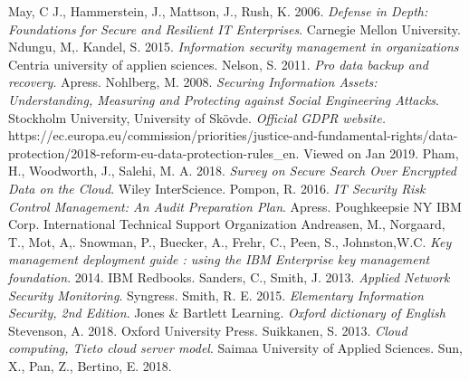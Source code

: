 \documentclass{article}
\begin{document}
\begin{thebibliography}{9}
	May, C J.,
	Hammerstein, J.,
	Mattson, J.,
	Rush, K.
	2006.
	\textit{Defense in Depth: Foundations for Secure and Resilient IT Enterprises}.
	Carnegie Mellon University.
	Ndungu, M,.
	Kandel, S.
	2015.
	\textit{Information security management in organizations}
	Centria university of applien sciences.
        Nelson, S.
        2011.
        \textit{Pro data backup and recovery}.
	Apress.
	Nohlberg, M.
	2008.
	\textit{Securing Information Assets: Understanding, Measuring and Protecting against Social Engineering Attacks}.
	Stockholm University,
	University of Skövde.
	\textit{Official GDPR website.}
	https://ec.europa.eu/commission/priorities/justice-and-fundamental-rights/data-protection/2018-reform-eu-data-protection-rules\_en.
	Viewed on Jan 2019.
	Pham, H.,
	Woodworth, J.,
	Salehi, M. A.
	2018.
	\textit{Survey on Secure Search Over Encrypted Data on the Cloud}.
	Wiley InterScience.
        Pompon, R.
        2016.
        \textit{IT Security Risk Control Management: An Audit Preparation Plan}.
	Apress.
        Poughkeepsie NY IBM Corp. International Technical Support Organization
        Andreasen, M.,
        Norgaard, T.,
        Mot, A,.
        Snowman, P.,
        Buecker, A.,
        Frehr, C.,
        Peen, S.,
        Johnston,W.C.
	\textit{Key management deployment guide : using the IBM Enterprise key management foundation}.
        2014.
	IBM Redbooks.
        Sanders, C.,
	Smith, J.
        2013.
        \textit{Applied Network Security Monitoring}.
	Syngress.
        Smith, R. E.
        2015.
	\textit{Elementary Information Security, 2nd Edition}.
        Jones \& Bartlett Learning.
	\textit{Oxford dictionary of English}
	Stevenson, A.
	2018.
	Oxford University Press.
        Suikkanen, S.
        2013.
	\textit{Cloud computing, Tieto cloud server model}.
        Saimaa University of Applied Sciences.
        Sun, X.,
        Pan, Z.,
        Bertino, E.
        2018.

\end{thebibliography}
\end{document}
